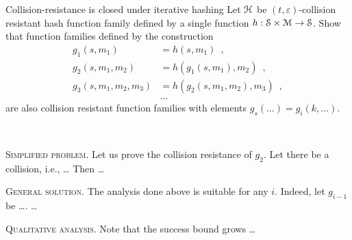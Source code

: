 \documentclass{crypto-exercise}
\author{Sven Laur}
\begin{document}
\begin{exercise}{Collision-resistance is closed under iterative hashing}
Let $\mathcal{H}$ be $(t,\varepsilon)$-collision resistant hash function family defined by a single function $h:\mathcal{S}\times\mathcal{M}\to\mathcal{S}$. Show that function families defined by the construction
\begin{align*}
g_1(s, m_1) &= h(s,m_1)\enspace,\\
g_2(s, m_1, m_2)&=h(g_1(s, m_1), m_2)\enspace,\\
g_3(s, m_1, m_2, m_3)&=h(g_2(s, m_1, m_2), m_3)\enspace,\\
&\ldots
\end{align*}
are also collision resistant function families with elements $g_s(\ldots) =g_i(k, \ldots)$.

\end{exercise}
\begin{solution} 
\

\vspace*{2ex}
\noindent
\textsc{Simplified problem.}
Let us prove the collision resistance of $g_2$. Let there be a collision, i.e., \ldots
Then \ldots 


\vspace*{2ex}
\noindent
\textsc{General solution.}
The analysis done above is suitable for any $i$. Indeed, let $g_{i-1}$ be \ldots. 
 \ldots


\vspace*{2ex}
\noindent
\textsc{Qualitative analysis.} Note that the success bound grows \ldots 

\end{solution}
\end{document}
